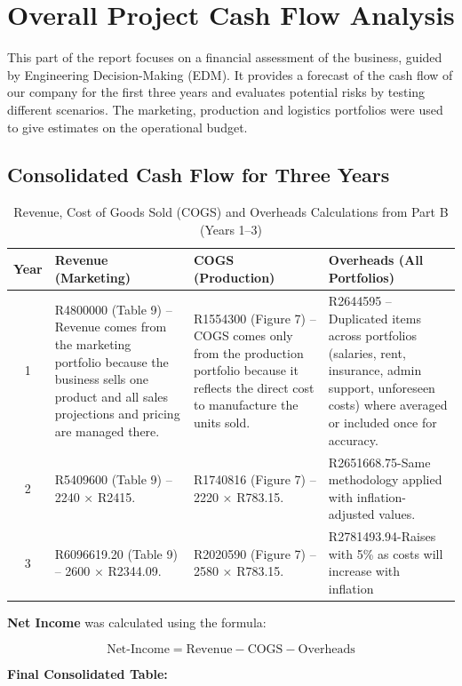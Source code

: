 
\large
\section{Overall Project Cash Flow Analysis}
    This part of the report focuses on a financial assessment of the business, guided by Engineering Decision-Making (EDM). It provides a forecast of the cash flow of our company for the first three years and evaluates potential risks by testing different scenarios. The marketing, production and logistics portfolios were used to give estimates on the operational budget.

\subsection*{Consolidated Cash Flow for Three Years}
\begin{table}[H]
\centering
\caption{Revenue, Cost of Goods Sold (COGS) and Overheads Calculations from Part B (Years 1–3)}
\renewcommand{\arraystretch}{1.5}
\begin{tabular}{|c|p{4.5cm}|p{4.5cm}|p{4.5cm}|}
\hline
\textbf{Year} & \textbf{Revenue (Marketing)} & \textbf{COGS (Production)} & \textbf{Overheads (All Portfolios)} \\
\hline
1 & R4800000 (Table 9) – Revenue comes from the marketing portfolio because the business sells one product and all sales projections and pricing are managed there.& R1554300 (Figure 7) – COGS comes only from the production portfolio because it reflects the direct cost to manufacture the units sold.& R2644595 – Duplicated items across portfolios (salaries, rent, insurance, admin support, unforeseen costs) where averaged or included once for accuracy. \\
\hline
2 & R5409600 (Table 9) – 2240 × R2415. & R1740816 (Figure 7) – 2220 × R783.15. & R2651668.75-Same methodology applied with inflation-adjusted values. \\
\hline
3 & R6096619.20 (Table 9) – 2600 × R2344.09. & R2020590 (Figure 7) – 2580 × R783.15. & R2781493.94-Raises with 5\% as costs will increase with inflation  \\
\hline
\end{tabular}
\end{table}

\noindent \textbf{Net Income} was calculated using the formula:

\[
\text{Net-Income} = \text{Revenue} - \text{COGS} - \text{Overheads}
\]

\clearpage
\vspace*{0.5em}
\textbf{Final Consolidated Table:}

